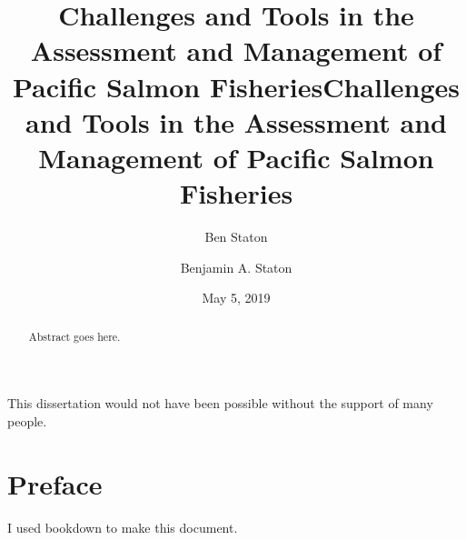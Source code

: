 \documentclass[12pt,]{book}
\title{Challenges and Tools in the Assessment and Management of Pacific Salmon
Fisheries}
\author{Ben Staton}
\date{}
\title{Challenges and Tools in the Assessment and Management of Pacific Salmon Fisheries}
\author{Benjamin A. Staton}
\date{May 5, 2019} %
\theoremstyle{definition}
\theoremstyle{definition}
\theoremstyle{definition}
\theoremstyle{remark}
\begin{document}
\maketitle

\begin{romanpages}      %

\TitlePage 

\doublespacing

\begin{abstract} 
Abstract goes here.
\end{abstract}

\begin{acknowledgments}
This dissertation would not have been possible without the support of many people.
\end{acknowledgments}

\begin{singlespace}
	\tableofcontents
	\clearpage
	\listoffigures
	\clearpage
	\listoftables
\end{singlespace}

\end{romanpages}        %

\normalem       %

\setlength{\parskip}{0pt plus 0pt minus 0pt}

\doublespacing

\chapter*{Preface}\label{preface}

I used bookdown \citep{xie-2015} to make this document.
\end{document}
